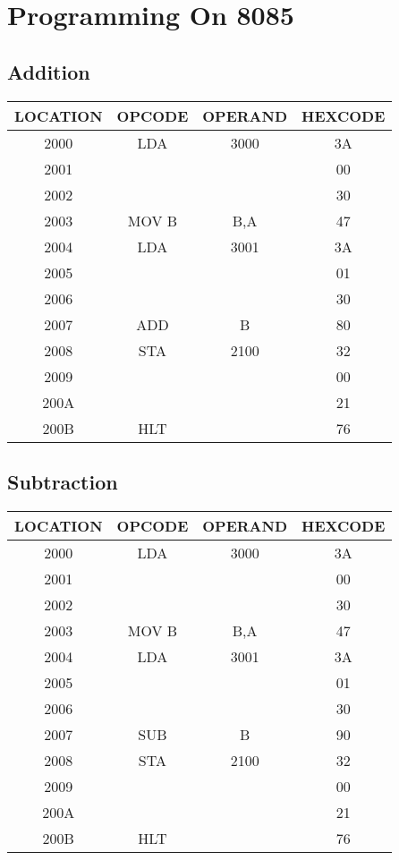 \documentclass[14pt]{article}
\begin{document}
\section{Programming On 8085}
\subsection{Addition}
\begin{center}
\vspace{1em}
\begin{tabular}{ |c|c|c|c| }
	\hline
	\textbf{LOCATION} & \textbf{OPCODE} & \textbf{OPERAND} & \textbf{HEXCODE} \\
	\hline
	2000 & LDA & 3000 & 3A \\
	\hline
	2001 &  &  & 00 \\ 
	\hline
	2002 &  &  & 30 \\
	\hline
	2003 & MOV B & B,A & 47 \\
	\hline
	2004 & LDA & 3001 & 3A \\
	\hline
	2005 &  &  & 01 \\
	\hline
	2006 &  &  & 30 \\
	\hline
	2007 & ADD & B & 80 \\
	\hline
	2008 & STA & 2100 & 32 \\
	\hline
	2009 &  &  & 00 \\
	\hline
	200A &  &  & 21 \\
	\hline
	200B & HLT &  & 76 \\
	\hline	
\end{tabular}
\end{center}

\subsection{Subtraction}
\begin{center}
\vspace{1em}
\begin{tabular}{ |c|c|c|c| }
	\hline
	\textbf{LOCATION} & \textbf{OPCODE} & \textbf{OPERAND} & \textbf{HEXCODE} \\
	\hline
	2000 & LDA & 3000 & 3A \\
	\hline
	2001 &  &  & 00 \\ 
	\hline
	2002 &  &  & 30 \\
	\hline
	2003 & MOV B & B,A & 47 \\
	\hline
	2004 & LDA & 3001 & 3A \\
	\hline
	2005 &  &  & 01 \\
	\hline
	2006 &  &  & 30 \\
	\hline
	2007 & SUB & B & 90 \\
	\hline
	2008 & STA & 2100 & 32 \\
	\hline
	2009 &  &  & 00 \\
	\hline
	200A &  &  & 21 \\
	\hline
	200B & HLT &  & 76 \\
	\hline	
\end{tabular}
\end{center}
\end{document}
